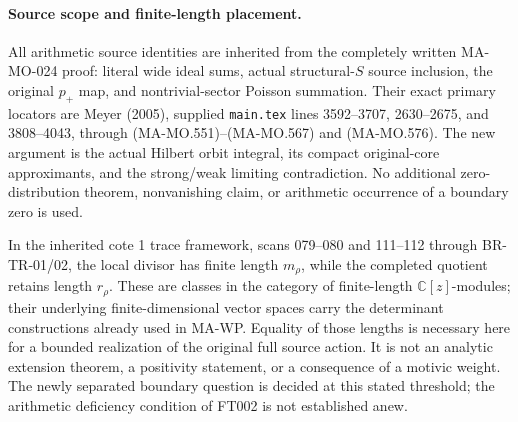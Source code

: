 \paragraph{Source scope and finite-length placement.}
All arithmetic source identities are inherited from
the completely written MA-MO-024 proof: literal wide
ideal sums, actual structural-\(S\) source inclusion,
the original \(p_+\) map, and nontrivial-sector Poisson
summation. Their exact primary locators are Meyer
(2005), supplied \texttt{main.tex} lines 3592--3707,
2630--2675, and 3808--4043, through
(MA-MO.551)--(MA-MO.567) and (MA-MO.576).
The new argument is the actual Hilbert orbit integral,
its compact original-core approximants, and the
strong/weak limiting contradiction.
No additional zero-distribution theorem, nonvanishing
claim, or arithmetic occurrence of a boundary zero is
used.

In the inherited cote 1 trace framework, scans 079--080
and 111--112 through BR-TR-01/02, the local divisor has
finite length \(m_\rho\), while the completed quotient
retains length \(r_\rho\). These are classes in the
category of finite-length \(\mathbb C[z]\)-modules;
their underlying finite-dimensional vector spaces
carry the determinant constructions already used in
MA-WP. Equality of those lengths is necessary here
for a bounded realization of the original full source
action. It is not an analytic extension theorem, a
positivity statement, or a consequence of a motivic
weight. The newly separated boundary question is
decided at this stated threshold; the arithmetic
deficiency condition of FT002 is not established anew.
